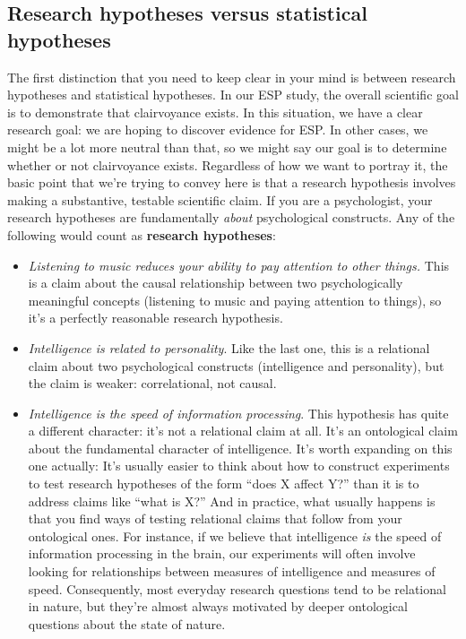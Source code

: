 \documentclass[
]{book}
\providecommand{\tightlist}{%
  \setlength{\itemsep}{0pt}\setlength{\parskip}{0pt}}
\theoremstyle{definition}
\theoremstyle{definition}
\theoremstyle{definition}
\theoremstyle{definition}
\theoremstyle{remark}
\begin{document}
\hypertarget{research-hypotheses-versus-statistical-hypotheses}{%
\subsection{Research hypotheses versus statistical hypotheses}\label{research-hypotheses-versus-statistical-hypotheses}}

The first distinction that you need to keep clear in your mind is between research hypotheses and statistical hypotheses. In our ESP study, the overall scientific goal is to demonstrate that clairvoyance exists. In this situation, we have a clear research goal: we are hoping to discover evidence for ESP. In other cases, we might be a lot more neutral than that, so we might say our goal is to determine whether or not clairvoyance exists. Regardless of how we want to portray it, the basic point that we're trying to convey here is that a research hypothesis involves making a substantive, testable scientific claim. If you are a psychologist, your research hypotheses are fundamentally \emph{about} psychological constructs. Any of the following would count as \textbf{research hypotheses}:

\begin{itemize}
\tightlist
\item
  \emph{Listening to music reduces your ability to pay attention to other things.} This is a claim about the causal relationship between two psychologically meaningful concepts (listening to music and paying attention to things), so it's a perfectly reasonable research hypothesis.
\item
  \emph{Intelligence is related to personality}. Like the last one, this is a relational claim about two psychological constructs (intelligence and personality), but the claim is weaker: correlational, not causal.
\item
  \emph{Intelligence is the speed of information processing}. This hypothesis has quite a different character: it's not a relational claim at all. It's an ontological claim about the fundamental character of intelligence. It's worth expanding on this one actually: It's usually easier to think about how to construct experiments to test research hypotheses of the form ``does X affect Y?'' than it is to address claims like ``what is X?'' And in practice, what usually happens is that you find ways of testing relational claims that follow from your ontological ones. For instance, if we believe that intelligence \emph{is} the speed of information processing in the brain, our experiments will often involve looking for relationships between measures of intelligence and measures of speed. Consequently, most everyday research questions tend to be relational in nature, but they're almost always motivated by deeper ontological questions about the state of nature.
\end{itemize}
\end{document}
